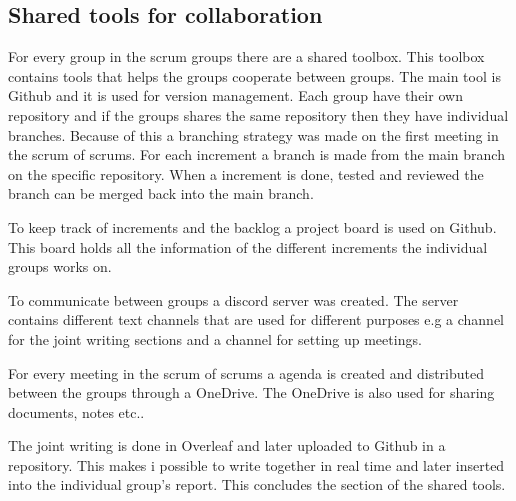 \subsection{Shared tools for collaboration}
For every group in the scrum groups there are a shared toolbox.
This toolbox contains tools that helps the groups cooperate between groups.
The main tool is Github and it is used for version management.  
Each group have their own repository and if the groups shares the same repository then they have individual branches.
Because of this a branching strategy was made on the first meeting in the scrum of scrums.
For each increment a branch is made from the main branch on the specific repository. 
When a increment is done, tested and reviewed the branch can be merged back into the main branch.

To keep track of increments and the backlog a project board is used on Github.
This board holds all the information of the different increments the individual groups works on.

To communicate between groups a discord server was created.
The server contains different text channels that are used for different purposes e.g a channel for the joint writing sections and a channel for setting up meetings.

For every meeting in the scrum of scrums a agenda is created and distributed between the groups through a OneDrive.
The OneDrive is also used for sharing documents, notes etc..

The joint writing is done in Overleaf and later uploaded to Github in a repository.
This makes i possible to write together in real time and later inserted into the individual group's report.
This concludes the section of the shared tools.